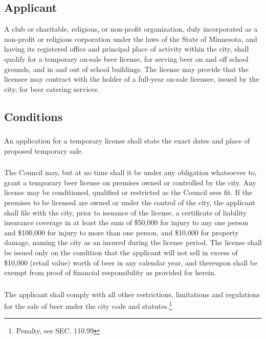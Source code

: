\subsection{Applicant}
A club or charitable, religious, or non-profit organization, duly incorporated as a non-profit or religious corporation under the laws of the State of Minnesota, and having its registered office and principal place of activity within the city, shall qualify for a temporary on-sale beer license, for serving beer on and off school grounds, and in and out of school buildings.  The license may provide that the licensee may contract with the holder of a full-year on-sale licensee, issued by the city, for beer catering services.
\subsection{Conditions}
\subsubsection{}
An application for a temporary license shall state the exact dates and place of proposed temporary sale.
\subsubsection{}
The Council may, but at no time shall it be under any obligation whatsoever to, grant a temporary beer license on premises owned or controlled by the city.  Any license may be conditioned, qualified or restricted as the Council sees fit.  If the premises to be licensed are owned or under the control of the city, the applicant shall file with the city, prior to issuance of the license, a certificate of liability insurance coverage in at least the sum of \$50,000 for injury to any one person and \$100,000 for injury to more than one person, and \$10,000 for property damage, naming the city as an insured during the license period.  The license shall be issued only on the condition that the applicant will not sell in excess of \$10,000 (retail value) worth of beer in any calendar year, and thereupon shall be exempt from proof of financial responsibility as provided for herein.
\subsubsection{}
The applicant shall comply with all other restrictions, limitations and regulations for the sale of beer under the city code and statutes.\footnote{Penalty, see SEC. 110.99}

